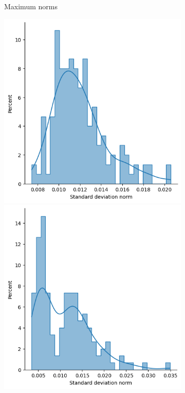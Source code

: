 \begin{figure}[htb]
\begin{subfigure}[t]{0.315\textwidth}
            \caption{Maximum norms}\label{fig:normstdairplane2}
          \end{subfigure}\hfill
          \begin{subfigure}[t]{0.315\textwidth}
            \includegraphics[width=\textwidth]{figures/dropcon/matched_avg_std_norms.png}
            \includegraphics[width=\textwidth]{figures/dropout/matched_avg_std_norms.png}

\end{subfigure}
\end{figure}
